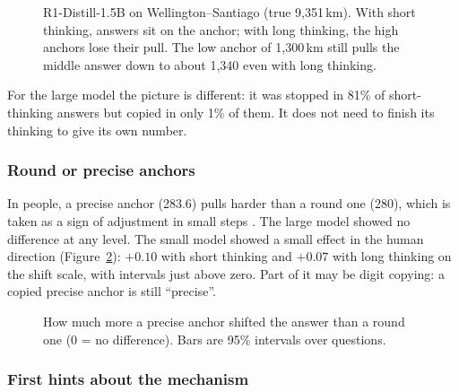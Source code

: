 \documentclass[11pt,a4paper]{article}
\begin{document}
\begin{figure}[ht]
\centering{}
\caption{R1-Distill-1.5B on Wellington--Santiago (true 9,351\,km). With short thinking, answers sit on the anchor; with long thinking, the high anchors lose their pull. The low anchor of 1,300\,km still pulls the middle answer down to about 1,340 even with long thinking.}
\label{e6:fig:wellington}
\end{figure}

For the large model the picture is different: it was stopped in 81\% of short-thinking answers but copied in only 1\% of them. It does not need to finish its thinking to give its own number.

\subsubsection{Round or precise anchors}

In people, a precise anchor (283.6) pulls harder than a round one (280), which is taken as a sign of adjustment in small steps \citep{janiszewski2008precision}. The large model showed no difference at any level. The small model showed a small effect in the human direction (Figure~\ref{e6:fig:precision}): $+0.10$ with short thinking and $+0.07$ with long thinking on the shift scale, with intervals just above zero. Part of it may be digit copying: a copied precise anchor is still \enquote{precise}.

\begin{figure}[ht]
\centering{}
\caption{How much more a precise anchor shifted the answer than a round one (0 = no difference). Bars are 95\% intervals over questions.}
\label{e6:fig:precision}
\end{figure}

\subsubsection{First hints about the mechanism}
\end{document}
